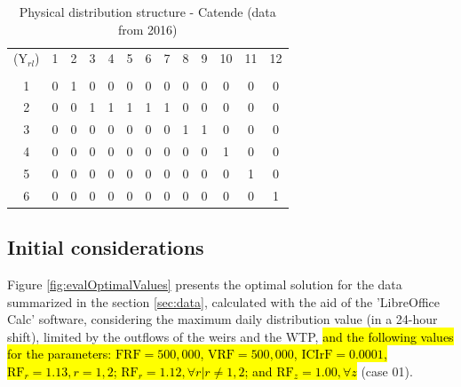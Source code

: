 \documentclass{singlecol}
\theoremstyle{TH}{
\newtheorem{lemma}{Lemma}
\newtheorem{theorem}[lemma]{Theorem}
\newtheorem{corrolary}[lemma]{Corrolary}
\newtheorem{conjecture}[lemma]{Conjecture}
\newtheorem{proposition}[lemma]{Proposition}
\newtheorem{claim}[lemma]{Claim}
\newtheorem{stheorem}[lemma]{Wrong Theorem}
\newtheorem{algorithm}{Algorithm}
}
\theoremstyle{THrm}{
\newtheorem{definition}{Definition}[section]
\newtheorem{question}{Question}[section]
\newtheorem{remark}{Remark}
\newtheorem{scheme}{Scheme}
}
\theoremstyle{THhit}{
\newtheorem{case}{Case}[section]
}
\begin{document}
\begin{table}[H]
\begin{center}
	\begin{tabular}{ c c c c c c c c c c c c c } 

		($\mathrm{Y}_{rl}$)	& 1 & 2 & 3 & 4 & 5 & 6 & 7 & 8 & 9 & 10 & 11 & 12  \\
		                                                                      \\
		1	              	& 0 & 1 & 0 & 0 & 0 & 0 & 0 & 0 & 0 &  0 &  0 &  0  \\
		2                 	& 0 & 0 & 1 & 1 & 1 & 1 & 1 & 0 & 0 &  0 &  0 &  0  \\
		3                 	& 0 & 0 & 0 & 0 & 0 & 0 & 0 & 1 & 1 &  0 &  0 &  0  \\
		4                 	& 0 & 0 & 0 & 0 & 0 & 0 & 0 & 0 & 0 &  1 &  0 &  0  \\
		5                 	& 0 & 0 & 0 & 0 & 0 & 0 & 0 & 0 & 0 &  0 &  1 &  0  \\
	    6                 	& 0 & 0 & 0 & 0 & 0 & 0 & 0 & 0 & 0 &  0 &  0 &  1  \\
	\end{tabular}
\caption{Physical distribution structure - Catende (data from 2016)}
\label{tab:phyDitStr}
\end{center}
\end{table}

\subsection{Initial considerations}
\label{sec:initialConsiderations}

Figure \ref{fig:evalOptimalValues} presents the optimal solution for the data summarized in the section \ref{sec:data}, calculated with the aid of the 'LibreOffice Calc' software, considering the maximum daily distribution value (in a 24-hour shift), limited by the outflows of the weirs and the WTP,  \hl{and the following values for the parameters: $\mathrm{FRF}= 500,000$, $\mathrm{VRF}= 500,000$,  $\mathrm{ICIrF} = 0.0001$,  $\mathrm{RF}_r = 1.13, r=1,2$;  $\mathrm{RF}_r = 1.12,  \forall r | r \neq 1,2$; and $\mathrm{RF}_z =1.00, \forall z$} (case 01). 
\end{document}
